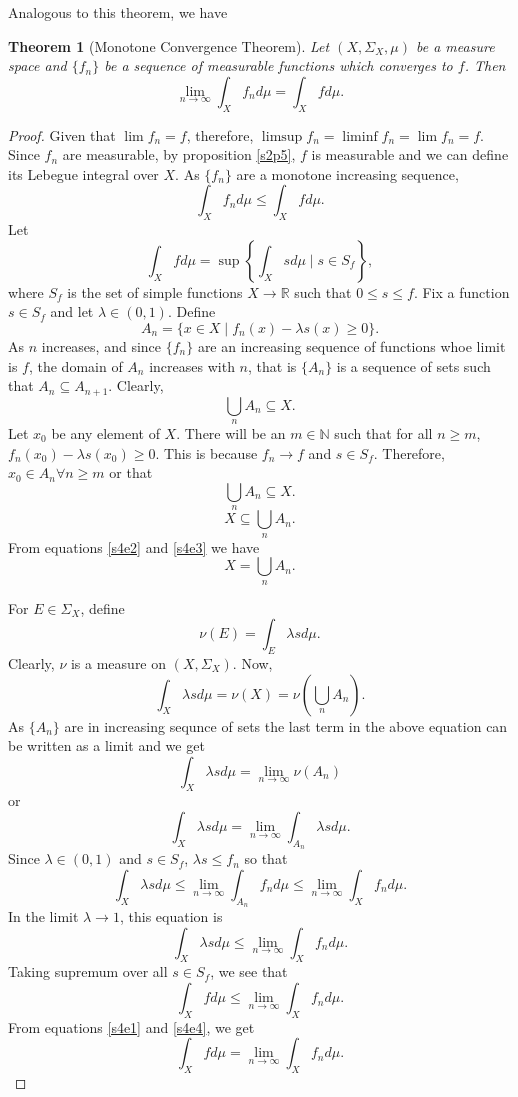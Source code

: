 \documentclass{article}
\newcommand{\sor}{\mathbb{R}}
\newcommand{\son}{\mathbb{N}}
\theoremstyle{plain}
\newtheorem{thm}{Theorem}
\numberwithin{thm}{section}
\theoremstyle{plain}
\numberwithin{prop}{section}
\theoremstyle{definition}
\numberwithin{defn}{section}
\theoremstyle{remark}
\theoremstyle{plain}
\numberwithin{cor}{section}
\numberwithin{equation}{section}
\begin{document}
Analogous to this theorem, we have
\begin{thm}[Monotone Convergence Theorem]\label{s4t2}Let $(X, \Sigma_X, \mu)$ be a 
measure space and $\{f_n\}$ be a sequence of measurable functions which 
converges to $f$. Then 
\[
\lim_{n\rightarrow\infty}\int_X f_n d\mu = \int_X fd\mu.
\]
\end{thm}
\begin{proof}
Given that $\lim f_n = f$, therefore, $\limsup f_n = \liminf f_n = \lim f_n = f$.
Since $f_n$ are measurable, by proposition \ref{s2p5}, $f$ is measurable and
we can define its Lebegue integral over $X$. As $\{f_n\}$ are a monotone
increasing sequence,
\begin{equation}\label{s4e1}
\int_X f_n d\mu \le \int_X fd\mu.
\end{equation}
Let 
\[
\int_X fd\mu = \sup\left\{\int_X s d\mu \;|\; s \in S_f\right\},
\]
where $S_f$ is the set of simple functions $X \rightarrow \sor$ such that
$0 \le s \le f$. Fix a function $s \in S_f$ and let $\lambda \in (0, 1)$. Define
\[
A_n = \{x \in X \;|\; f_n(x) - \lambda s(x) \ge 0\}.
\]
As $n$ increases, and since $\{f_n\}$ are an increasing sequence of functions
whoe limit is $f$, the domain of $A_n$ increases with $n$, that is $\{A_n\}$ 
is a sequence of sets such that $A_n \subseteq A_{n+1}$. Clearly,
\begin{equation}\label{s4e2}
\bigcup_n A_n \subseteq X.
\end{equation}
Let $x_0$ be any element of $X$. There will be an $m \in \son$ such that for
all $n \ge m$, $f_n(x_0) - \lambda s(x_0) \ge 0$. This is because $f_n \rightarrow
f$ and $s \in S_f$. Therefore, $x_0 \in A_n \forall n \ge m$ or that
\[
\bigcup_n A_n \subseteq X.
\]
\begin{equation}\label{s4e3}
X \subseteq \bigcup_n A_n.
\end{equation}
From equations \eqref{s4e2} and \eqref{s4e3} we have
\[
X = \bigcup_n A_n.
\]

For $E \in \Sigma_X$, define
\[
\nu(E) = \int_E \lambda s d\mu.
\]
Clearly, $\nu$ is a measure on $(X, \Sigma_X)$. Now,
\[
\int_X \lambda s d\mu = \nu(X) = \nu\left(\bigcup_n A_n\right).
\]
As $\{A_n\}$ are in increasing sequnce of sets the last term in the above equation
can be written as a limit and we get
\[
\int_X \lambda s d\mu = \lim_{n \rightarrow \infty}\nu(A_n)
\]
or
\[
\int_X \lambda s d\mu = \lim_{n \rightarrow \infty}\int_{A_n}\lambda s d\mu.
\]
Since $\lambda \in (0, 1)$ and $s \in S_f$, $\lambda s \le f_n$ so that
\[
\int_X \lambda s d\mu \le \lim_{n \rightarrow \infty}\int_{A_n}f_n d\mu
\le \lim_{n \rightarrow \infty}\int_X f_n d\mu.
\]
In the limit $\lambda \rightarrow 1$, this equation is
\[
\int_X \lambda s d\mu \le \lim_{n \rightarrow \infty}\int_X f_n d\mu.
\]
Taking supremum over all $s \in S_f$, we see that
\begin{equation}\label{s4e4}
\int_X f d\mu \le \lim_{n \rightarrow \infty}\int_X f_n d\mu.
\end{equation}
From equations \eqref{s4e1} and \eqref{s4e4}, we get
\[
\int_X f d\mu = \lim_{n \rightarrow \infty}\int_X f_n d\mu.
\]
\end{proof}
\end{document}
